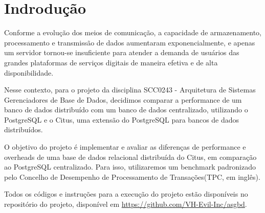 \section{Indrodução}

Conforme a evolução dos meios de comunicação, a capacidade de armazenamento, processamento e transmissão de dados aumentaram exponencialmente, 
e apenas um servidor tornou-se insuficiente para atender a demanda de usuários das grandes plataformas 
de serviços digitais de maneira efetiva e de alta disponibilidade.

Nesse contexto, para o projeto da disciplina SCC0243 - Arquitetura de Sistemas Gerenciadores de Base de Dados,
decidimos comparar a performance de um banco de dados distribuído com um banco de dados centralizado,
utilizando o PostgreSQL e o Citus, uma extensão do PostgreSQL para bancos de dados distribuídos.

O objetivo do projeto é implementar e avaliar as diferenças de performance e overheads de uma base de dados
relacional distribuída do Citus, em comparação ao PostgreSQL centralizado. 
Para isso, utilizaremos um benchmark padronizado pelo Concelho de Desempenho de Processamento de Transações(TPC, em inglês).

Todos os códigos e instruções para a execução do projeto estão disponíveis no repositório do projeto,
disponível em \url{https://github.com/VH-Evil-Inc/asgbd}.